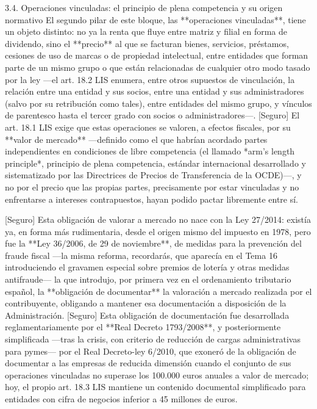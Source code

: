 \documentclass[10pt,a4paper]{article}
\begin{document}
3.4. Operaciones vinculadas: el principio de plena competencia y su origen normativo
El segundo pilar de este bloque, las **operaciones vinculadas**, tiene un objeto distinto: no ya la renta que fluye entre matriz y filial en forma de dividendo, sino el **precio** al que se facturan bienes, servicios, préstamos, cesiones de uso de marcas o de propiedad intelectual, entre entidades que forman parte de un mismo grupo o que están relacionadas de cualquier otro modo tasado por la ley —el art. 18.2 LIS enumera, entre otros supuestos de vinculación, la relación entre una entidad y sus socios, entre una entidad y sus administradores (salvo por su retribución como tales), entre entidades del mismo grupo, y vínculos de parentesco hasta el tercer grado con socios o administradores—. [Seguro] El art. 18.1 LIS exige que estas operaciones se valoren, a efectos fiscales, por su **valor de mercado** —definido como el que habrían acordado partes independientes en condiciones de libre competencia (el llamado *arm's length principle*, principio de plena competencia, estándar internacional desarrollado y sistematizado por las Directrices de Precios de Transferencia de la OCDE)—, y no por el precio que las propias partes, precisamente por estar vinculadas y no enfrentarse a intereses contrapuestos, hayan podido pactar libremente entre sí.

[Seguro] Esta obligación de valorar a mercado no nace con la Ley 27/2014: existía ya, en forma más rudimentaria, desde el origen mismo del impuesto en 1978, pero fue la **Ley 36/2006, de 29 de noviembre**, de medidas para la prevención del fraude fiscal —la misma reforma, recordarás, que aparecía en el Tema 16 introduciendo el gravamen especial sobre premios de lotería y otras medidas antifraude— la que introdujo, por primera vez en el ordenamiento tributario español, la **obligación de documentar** la valoración a mercado realizada por el contribuyente, obligando a mantener esa documentación a disposición de la Administración. [Seguro] Esta obligación de documentación fue desarrollada reglamentariamente por el **Real Decreto 1793/2008**, y posteriormente simplificada —tras la crisis, con criterio de reducción de cargas administrativas para pymes— por el Real Decreto-ley 6/2010, que exoneró de la obligación de documentar a las empresas de reducida dimensión cuando el conjunto de sus operaciones vinculadas no superase los 100.000 euros anuales a valor de mercado; hoy, el propio art. 18.3 LIS mantiene un contenido documental simplificado para entidades con cifra de negocios inferior a 45 millones de euros.
\end{document}
